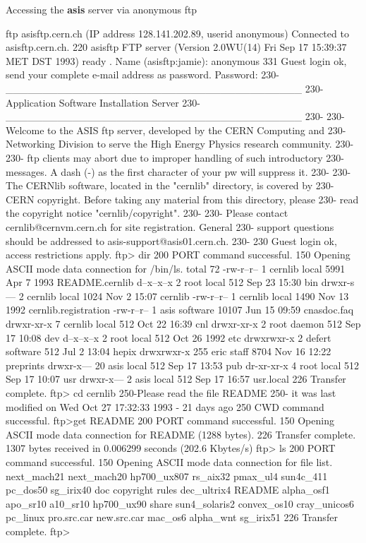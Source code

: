 \begin{XMPt}{Accessing the {\bf asis} server via anonymous ftp}
 
ftp asisftp.cern.ch      (IP address 128.141.202.89, userid anonymous)
Connected to asisftp.cern.ch.
220 asisftp FTP server (Version 2.0WU(14) Fri Sep 17 15:39:37 MET DST 1993) ready
.
Name (asisftp:jamie): anonymous
331 Guest login ok, send your complete e-mail address as password.
Password:
230-                   ________________________________________
230-                   Application Software Installation Server
230-                   ________________________________________
230-
230-   Welcome to the ASIS ftp server, developed by the CERN Computing and
230-   Networking Division to serve the High Energy Physics research community.
230-
230-   ftp clients may abort due to improper handling of such introductory
230-   messages. A dash (-) as the first character of your pw will suppress it.
230-
230-   The CERNlib software, located in the "cernlib" directory, is covered by
230-   CERN copyright. Before taking any material from this directory, please
230-   read the copyright notice "cernlib/copyright".
230-
230-   Please contact cernlib@cernvm.cern.ch for site registration. General
230-   support questions should be addressed to asis-support@asis01.cern.ch. 
230-
230 Guest login ok, access restrictions apply.
ftp> dir
200 PORT command successful.
150 Opening ASCII mode data connection for /bin/ls.
total 72
-rw-r--r--   1 cernlib  local        5991 Apr  7  1993 README.cernlib
d--x--x--x   2 root     local         512 Sep 23 15:30 bin
drwxr-s---   2 cernlib  local        1024 Nov  2 15:07 cernlib
-rw-r--r--   1 cernlib  local        1490 Nov 13  1992 cernlib.registration
-rw-r--r--   1 asis     software    10107 Jun 15 09:59 cnasdoc.faq
drwxr-xr-x   7 cernlib  local         512 Oct 22 16:39 cnl
drwxr-xr-x   2 root     daemon        512 Sep 17 10:08 dev
d--x--x--x   2 root     local         512 Oct 26  1992 etc
drwxrwxr-x   2 defert   software      512 Jul  2 13:04 hepix
drwxrwxr-x 255 eric     staff        8704 Nov 16 12:22 preprints
drwxr-x---  20 asis     local         512 Sep 17 13:53 pub
dr-xr-xr-x   4 root     local         512 Sep 17 10:07 usr
drwxr-x---   2 asis     local         512 Sep 17 16:57 usr.local
226 Transfer complete.
ftp> cd cernlib
250-Please read the file README
250-  it was last modified on Wed Oct 27 17:32:33 1993 - 21 days ago
250 CWD command successful.
ftp>get README
200 PORT command successful.
150 Opening ASCII mode data connection for README (1288 bytes).
226 Transfer complete.
1307 bytes received in 0.006299 seconds (202.6 Kbytes/s)
ftp> ls
200 PORT command successful.
150 Opening ASCII mode data connection for file list.
next_mach21
next_mach20
hp700_ux807
rs_aix32
pmax_ul4
sun4c_411
pc_dos50
sg_irix40
doc
copyright
rules
dec_ultrix4
README
alpha_osf1
apo_sr10
a10_sr10
hp700_ux90
share
sun4_solaris2
convex_os10
cray_unicos6
pc_linux
pro.src.car
new.src.car
mac_os6
alpha_wnt
sg_irix51
226 Transfer complete.
ftp> 
\end{XMPt}
 
